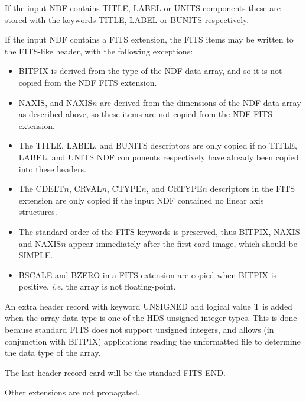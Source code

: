 {{{{            \sstitem
               If the input NDF contains TITLE, LABEL or UNITS components
               these are stored with the keywords TITLE, LABEL or BUNITS
               respectively.

            \sstitem
               If the input NDF contains a FITS extension, the FITS items
               may be written to the FITS-like header, with the following
               exceptions:
               \begin{itemize}
               \item BITPIX is derived from the type of the NDF data array,
               and so it is not copied from the NDF FITS extension.
               \item NAXIS, and NAXIS$n$ are derived from the dimensions of the
               NDF data array as described above, so these items are not
               copied from the NDF FITS extension.
               \item The TITLE, LABEL, and BUNITS descriptors are only copied
               if no TITLE, LABEL, and UNITS NDF components respectively
               have already been copied into these headers.
               \item The CDELT$n$, CRVAL$n$, CTYPE$n$, and CRTYPE$n$ descriptors
               in the FITS extension are only copied if the input NDF
               contained no linear axis structures.
               \item The standard order of the FITS keywords is preserved,
               thus BITPIX, NAXIS and NAXIS$n$ appear immediately after the
               first card image, which should be SIMPLE.
               \item BSCALE and BZERO in a FITS extension are copied when
               BITPIX is positive, {\it i.e.} the array is not floating-point.
               \end{itemize}

            \sstitem
               An extra header record with keyword UNSIGNED and logical
               value T is added when the array data type is one of the HDS
               unsigned integer types.  This is done because standard FITS
               does not support unsigned integers, and allows (in conjunction
               with BITPIX) applications reading the unformatted file to
               determine the data type of the array.

            \sstitem
               The last header record card will be the standard FITS END.
         }

         \sstitem
            Other extensions are not propagated.
      }
   }
}

